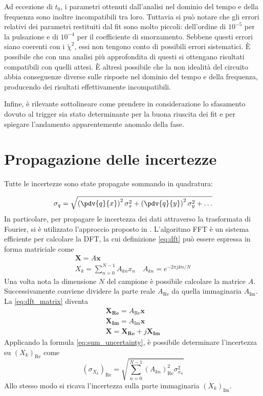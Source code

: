 \documentclass[12pt,a4paper, twocolumn]{article}
\newcommand{\bs}[1]{\boldsymbol{#1}}
\begin{document}
Ad eccezione di $t_0$, i parametri ottenuti dall'analisi nel dominio del tempo e della frequenza sono inoltre incompatibili tra loro. Tuttavia si può notare che gli errori relativi dei parametri restituiti dal fit sono molto piccoli: dell'ordine di $10^{-5}$ per la pulsazione e di $10^{-4}$ per il coefficiente di smorzamento. Sebbene questi errori siano coerenti con i $\tilde{\chi}^2$, essi non tengono conto di possibili errori sistematici. È possibile che con una analisi più approfondita di questi si ottengano risultati compatibili con quelli attesi. È altresì possibile che la non idealità del circuito abbia conseguenze diverse sulle risposte nel dominio del tempo e della frequenza, producendo dei risultati effettivamente incompatibili.

Infine, è rilevante sottolineare come prendere in considerazione lo sfasamento dovuto al trigger sia stato determinante per la buona riuscita dei fit e per spiegare l'andamento apparentemente anomalo della fase.

\appendixpage
\appendix
\section{Propagazione delle incertezze}
\label{app:error}

Tutte le incertezze sono state propagate sommando in quadratura:

\begin{equation}
\sigma_q = \sqrt{\left(\pdv{q}{x}\right) ^2 \sigma_{x}^2 + \left(\pdv{q}{y}\right) ^2 \sigma_{y}^2+ \dots}
\label{eq:sum_uncertainty}
\end{equation}
In particolare, per propagare le incertezza dei dati attraverso la trasformata di Fourier, si è utilizzato l'approccio proposto in \cite{uncertainty}. L'algoritmo FFT è un sistema efficiente per calcolare la DFT, la cui definizione \eqref{eq:dft} può essere espressa in forma matriciale come
\begin{gather}
\bs{X} = A \bs{x} \label{eq:dft_matrix} \\
X_k = \sum_{n=0}^{N-1} A_{kn} x_n \quad A_{kn} = e^{-2 \pi jkn / N}
\end{gather}
Una volta nota la dimensione $N$ del campione è possibile calcolare la matrice $A$. Successivamente conviene dividere la parte reale $A_\text{Re}$ da quella immaginaria $A_\text{Im}$. La \eqref{eq:dft_matrix} diventa
\begin{equation}
\begin{gathered}
\bs{X_\text{Re}} = A_\text{Re} \bs{x} \\
\bs{X_\text{Im}} = A_\text{Im} \bs{x} \\
\bs{X} = \bs{X_\text{Re}} + j \bs{X_\text{Im}}
\end{gathered}
\end{equation}
Applicando la formula \eqref{eq:sum_uncertainty}, è possibile determinare l'incertezza su $(X_k)_\text{Re}$ come
\begin{equation}
(\sigma_{X_k})_\text{Re} = \sqrt{\sum_{n=0}^{N-1} (A_{kn})_\text{Re}^2 \sigma_{x_n} ^ 2}
\end{equation}
Allo stesso modo si ricava l'incertezza sulla parte immaginaria $(X_k)_\text{Im}$.


\printbibliography
\end{document}
